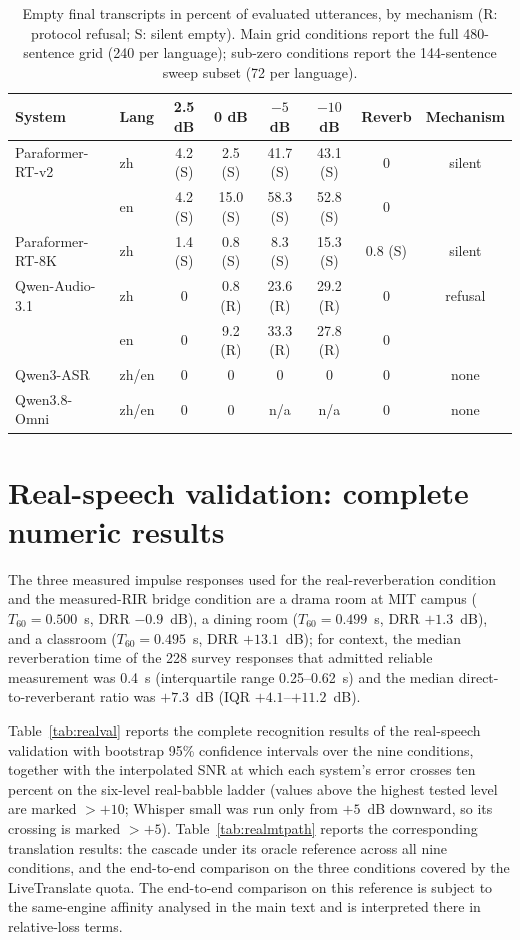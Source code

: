 \documentclass[11pt]{article}
\begin{document}
\begin{table}[h]
\centering
\caption{Empty final transcripts in percent of evaluated utterances, by
mechanism (R: protocol refusal; S: silent empty). Main grid conditions
report the full 480-sentence grid (240 per language); sub-zero conditions
report the 144-sentence sweep subset (72 per language).}
\label{tab:refusal}
\footnotesize
\setlength{\tabcolsep}{2.3pt}
\begin{tabular}{llcccccc}
\toprule
System & Lang & 2.5 dB & 0 dB & $-5$ dB & $-10$ dB & Reverb & Mechanism \\
\midrule
Paraformer-RT-v2 & zh & 4.2 (S) & 2.5 (S) & 41.7 (S) & 43.1 (S) & 0 & silent \\
 & en & 4.2 (S) & 15.0 (S) & 58.3 (S) & 52.8 (S) & 0 & \\
Paraformer-RT-8K & zh & 1.4 (S) & 0.8 (S) & 8.3 (S) & 15.3 (S) & 0.8 (S) & silent \\
Qwen-Audio-3.1 & zh & 0 & 0.8 (R) & 23.6 (R) & 29.2 (R) & 0 & refusal \\
 & en & 0 & 9.2 (R) & 33.3 (R) & 27.8 (R) & 0 & \\
Qwen3-ASR & zh/en & 0 & 0 & 0 & 0 & 0 & none \\
Qwen3.8-Omni & zh/en & 0 & 0 & n/a & n/a & 0 & none \\
\bottomrule
\end{tabular}
\end{table}

\section{Real-speech validation: complete numeric results}
\label{supp:real}

The three measured impulse responses used for the real-reverberation
condition and the measured-RIR bridge condition are a drama room at MIT
campus ($T_{60} = 0.500$~s, DRR $-0.9$~dB), a dining room ($T_{60} =
0.499$~s, DRR $+1.3$~dB), and a classroom ($T_{60} = 0.495$~s, DRR
$+13.1$~dB); for context, the median reverberation time of the 228 survey
responses that admitted reliable measurement was 0.4~s (interquartile
range 0.25--0.62~s) and the median direct-to-reverberant ratio was
$+7.3$~dB (IQR $+4.1$--$+11.2$~dB).

Table~\ref{tab:realval} reports the complete recognition results of the
real-speech validation with bootstrap 95\% confidence intervals over the
nine conditions, together with the interpolated SNR at which each system's
error crosses ten percent on the six-level real-babble ladder (values
above the highest tested level are marked $>+10$; Whisper small was run
only from $+5$~dB downward, so its crossing is marked $>+5$).
Table~\ref{tab:realmtpath} reports the corresponding translation results:
the cascade under its oracle reference across all nine conditions, and the
end-to-end comparison on the three conditions covered by the LiveTranslate
quota. The end-to-end comparison on this reference is subject to the
same-engine affinity analysed in the main text and is interpreted there in
relative-loss terms.
\end{document}
